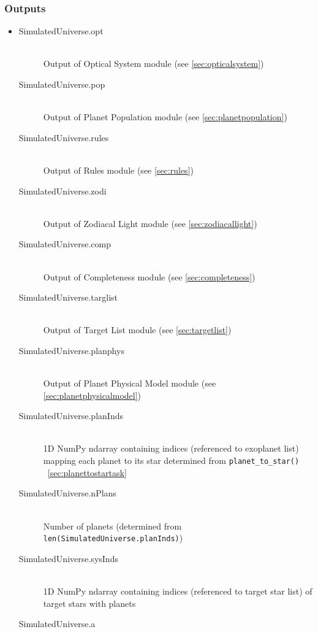 \documentclass[cleanfoot]{asme2ej}
\begin{document}
\subsubsection*{Outputs}
\begin{itemize}
    \item
    \begin{description}
        \item[SimulatedUniverse.opt] \hfill \\
        Output of Optical System module (see \ref{sec:opticalsystem})
        \item[SimulatedUniverse.pop] \hfill \\
        Output of Planet Population module (see \ref{sec:planetpopulation})
        \item[SimulatedUniverse.rules] \hfill \\
        Output of Rules module (see \ref{sec:rules})
        \item[SimulatedUniverse.zodi] \hfill \\
        Output of Zodiacal Light module (see \ref{sec:zodiacallight})
        \item[SimulatedUniverse.comp] \hfill \\
        Output of Completeness module (see \ref{sec:completeness})
        \item[SimulatedUniverse.targlist] \hfill \\
        Output of Target List module (see \ref{sec:targetlist})
        \item[SimulatedUniverse.planphys] \hfill \\
        Output of Planet Physical Model module (see \ref{sec:planetphysicalmodel})
        \item[SimulatedUniverse.planInds] \hfill \\
        1D NumPy ndarray containing indices (referenced to exoplanet list) mapping each planet to its star determined from \verb+planet_to_star()+ ~\ref{sec:planettostartask}
        \item[SimulatedUniverse.nPlans] \hfill \\
        Number of planets (determined from \verb+len(SimulatedUniverse.planInds)+)
        \item[SimulatedUniverse.sysInds] \hfill \\
        1D NumPy ndarray containing indices (referenced to target star list) of target stars with planets
        \item[SimulatedUniverse.a] \hfill \\

\end{description}
\end{itemize}
\end{document}
